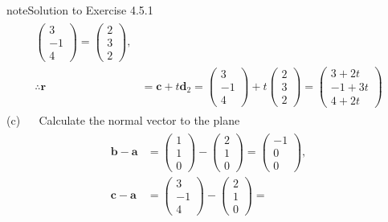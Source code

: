 \documentclass[letterpaper,10pt,english]{jupyterBook}
\begin{document}
\begin{sphinxadmonition}{note}{Solution to Exercise 4.5.1}
\begin{equation*}
\begin{split}
\begin{align*}
    \begin{pmatrix} 3 \\ -1 \\ 4 \end{pmatrix} = 
    \begin{pmatrix} 2 \\ 3 \\ 2 \end{pmatrix}, \\
    \therefore \mathbf{r} &= \mathbf{c} + t\mathbf{d}_2 =
    \begin{pmatrix} 3 \\ -1 \\ 4 \end{pmatrix} + t 
    \begin{pmatrix} 2 \\ 3 \\ 2 \end{pmatrix} = 
    \begin{pmatrix} 3 + 2 t \\ -1 + 3 t \\ 4 + 2 t \end{pmatrix}
\end{align*} \end{split}
\end{equation*}
\sphinxAtStartPar
(c)   Calculate the normal vector to the plane
\begin{equation*}
\begin{split} \begin{align*}
    \mathbf{b} - \mathbf{a} &= \begin{pmatrix} 1 \\ 1 \\ 0 \end{pmatrix} - 
    \begin{pmatrix} 2 \\ 1 \\ 0 \end{pmatrix} = 
    \begin{pmatrix} -1 \\ 0 \\ 0 \end{pmatrix}, \\
    \mathbf{c} - \mathbf{a} &= \begin{pmatrix} 3 \\ -1 \\ 4 \end{pmatrix} -
    \begin{pmatrix} 2 \\ 1 \\ 0 \end{pmatrix} =

\end{align*}
\end{split}
\end{equation*}
\end{sphinxadmonition}
\end{document}
